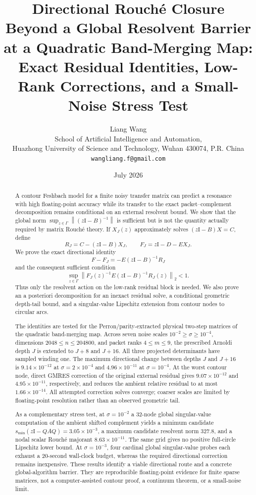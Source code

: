 \documentclass[11pt]{article}
\title{\textbf{Directional Rouch\'e Closure Beyond a Global Resolvent Barrier}\\
\textbf{at a Quadratic Band-Merging Map:}\\[0.35em]
\large Exact Residual Identities, Low-Rank Corrections, and a Small-Noise Stress Test}
\author{Liang Wang\\
\small School of Artificial Intelligence and Automation,\\[-0.2em]
\small Huazhong University of Science and Technology, Wuhan 430074, P.R. China\\
\small \texttt{wangliang.f@gmail.com}}
\date{July 2026}
\theoremstyle{definition}
\theoremstyle{remark}
\newcommand{\Id}{\mathrm I}
\newcommand{\smin}{s_{\min}}
\newcommand{\norm}[1]{\left\lVert#1\right\rVert}
\begin{document}
\maketitle

\begin{abstract}
A contour Feshbach model for a finite noisy transfer matrix can predict a
resonance with high floating-point accuracy while its transfer to the exact
packet--complement decomposition remains conditional on an external
resolvent bound.  We show that the global norm
\(\sup_{z\in\Gamma}\norm{(z\Id-B)^{-1}}\) is sufficient but is not the
quantity actually required by matrix Rouch\'e theory.  If \(X_J(z)\)
approximately solves \((z\Id-B)X=C\), define
\[
 R_J=C-(z\Id-B)X_J,
 \qquad F_J=z\Id-D-EX_J.
\]
We prove the exact directional identity
\[
 F-F_J=-E(z\Id-B)^{-1}R_J
\]
and the consequent sufficient condition
\[
 \sup_{z\in\Gamma}
 \norm{F_J(z)^{-1}E(z\Id-B)^{-1}R_J(z)}_2<1.
\]
Thus only the resolvent action on the low-rank residual block is needed.
We also prove an a posteriori decomposition for an inexact residual solve,
a conditional geometric depth-tail bound, and a singular-value Lipschitz
extension from contour nodes to circular arcs.

The identities are tested for the Perron/parity-extracted physical
two-step matrices of the quadratic band-merging map.  Across seven noise
scales \(10^{-2}\geq\sigma\geq10^{-4}\), dimensions
\(2048\leq n\leq204800\), and packet ranks \(4\leq m\leq9\), the
prescribed Arnoldi depth \(J\) is extended to \(J+8\) and \(J+16\).
All three projected determinants have sampled winding one.  The maximum
directional change between depths \(J\) and \(J+16\) is
\(9.14\times10^{-12}\) at \(\sigma=2\times10^{-4}\) and
\(4.96\times10^{-11}\) at \(\sigma=10^{-4}\).  At the worst contour
node, direct GMRES correction of the original external residual gives
\(9.07\times10^{-12}\) and \(4.95\times10^{-11}\), respectively, and
reduces the ambient relative residual to at most \(1.66\times10^{-14}\).
All attempted correction solves converge; coarser scales are limited by
floating-point resolution rather than an observed geometric tail.

As a complementary stress test, at \(\sigma=10^{-2}\) a 32-node global
singular-value computation of the ambient shifted complement yields a
minimum candidate
\(\smin(z\Id-QAQ)=3.05\times10^{-3}\), a maximum candidate resolvent norm
\(327.8\), and a nodal scalar Rouch\'e majorant
\(8.63\times10^{-11}\).  The same grid gives no positive full-circle
Lipschitz lower bound.  At \(\sigma=10^{-3}\), four cardinal global
singular-value probes each exhaust a 20-second wall-clock budget, whereas
the required directional correction remains inexpensive.  These results
identify a viable directional route and a concrete global-algorithm
barrier.  They are reproducible floating-point evidence for finite sparse
matrices, not a computer-assisted contour proof, a continuum theorem, or a
small-noise limit.
\end{abstract}
\end{document}
